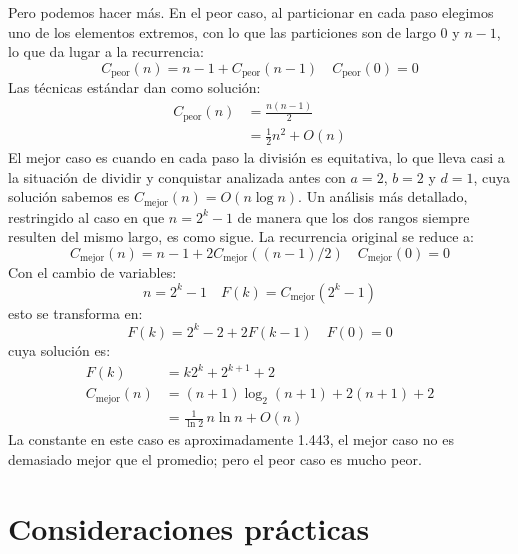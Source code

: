   Pero podemos hacer más.
  En el peor caso,
  al particionar en cada paso elegimos uno de los elementos extremos,
  con lo que las particiones son de largo 0 y \(n - 1\),
  lo que da lugar a la recurrencia:
  \begin{equation*}
    C_{\text{peor}}(n)
      = n - 1 + C_{\text{peor}}(n - 1) \quad C_{\text{peor}}(0) = 0
  \end{equation*}
  Las técnicas estándar dan como solución:
  \begin{align*}
    C_{\text{peor}}(n)
      &= \frac{n (n - 1)}{2} \\
      &= \frac{1}{2} n^2 + O(n)
  \end{align*}
  El mejor caso es cuando en cada paso la división es equitativa,
  lo que lleva casi a la situación de dividir y conquistar
  analizada antes
  con \(a = 2\), \(b = 2\) y \(d = 1\),
  cuya solución sabemos es \(C_{\text{mejor}}(n) = O(n \log n)\).
  Un análisis más detallado,
  restringido al caso en que \(n = 2^k - 1\)
  de manera que los dos rangos siempre resulten del mismo largo,
  es como sigue.
  La recurrencia original se reduce a:
  \begin{equation*}
    C_{\text{mejor}}(n)
      = n - 1 + 2 C_{\text{mejor}}((n - 1) / 2)
      \quad C_{\text{mejor}}(0) = 0
  \end{equation*}
  Con el cambio de variables:
  \begin{equation*}
    n = 2^k - 1 \quad F(k) = C_{\text{mejor}}(2^k - 1)
  \end{equation*}
  esto se transforma en:
  \begin{equation*}
    F(k)
      = 2^k - 2 + 2 F(k - 1) \quad F(0) = 0
  \end{equation*}
  cuya solución es:
  \begin{align*}
    F(k)
      &= k 2^k + 2^{k + 1} + 2 \\
    C_{\text{mejor}}(n)
      &= (n + 1) \log_2 (n + 1) + 2 (n + 1) + 2 \\
      &= \frac{1}{\ln 2} \, n \ln n + O(n)
  \end{align*}
  La constante en este caso es aproximadamente \num{1,443},
  el mejor caso no es demasiado mejor que el promedio;
  pero el peor caso es mucho peor.

\section{Consideraciones prácticas}
\label{sec:consideraciones-practicas}

